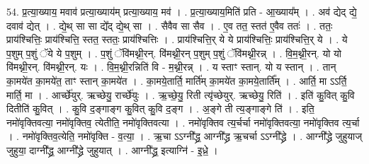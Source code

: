 \documentclass[17pt]{extarticle}
\begin{document}
54. प्र॒त्या॒ख्याय॒ मवाव॑ प्रत्या॒ख्याय॑म् प्रत्या॒ख्याय॒ मव॑ । . प्र॒त्या॒ख्याय॒मिति॑ प्रति - आ॒ख्याय᳚म् । . अव॑ द्येद् द्ये॒ दवाव॑ द्येत् । . द्ये॒थ् सा सा द्ये᳚द् द्ये॒थ् सा । . सैवैव सा सैव । . ए॒व तत॒ स्तत॑ ए॒वैव ततः॑ । . ततः॒ प्राय॑श्चित्तिः॒ प्राय॑श्चित्ति॒ स्तत॒ स्ततः॒ प्राय॑श्चित्तिः । . प्राय॑श्चित्ति॒र् ये ये प्राय॑श्चित्तिः॒ प्राय॑श्चित्ति॒र् ये । . ये प॒शुम् प॒शुं ॅये ये प॒शुम् । . प॒शुं ॅवि॑मथ्नी॒रन्. वि॑मथ्नी॒रन् प॒शुम् प॒शुं ॅवि॑मथ्नी॒रन्न् । . वि॒म॒थ्नी॒रन्. यो यो वि॑मथ्नी॒रन्. वि॑मथ्नी॒रन्. यः । . वि॒म॒थ्नी॒रन्निति॑ वि - म॒थ्नी॒रन्न् । . य स्ताꣳ स्तान्. यो य स्तान् । . तान् का॒मये॑त का॒मये॑त॒ ताꣳ स्तान् का॒मये॑त । . का॒मये॒तार्ति॒ मार्ति॑म् का॒मये॑त का॒मये॒तार्ति᳚म् । . आर्ति॒ मा ऽऽर्ति॒ मार्ति॒ मा । . आर्च्छे॑युर्. ऋच्छेयु॒ रार्च्छे॑युः । . ऋ॒च्छे॒यु॒ रिती त्यृ॑च्छेयुर्. ऋच्छेयु॒ रिति॑ । . इति॑ कु॒वित् कु॒वि दितीति॑ कु॒वित् । . कु॒वि द॒ङ्गाङ्ग कु॒वित् कु॒वि द॒ङ्ग । . अ॒ङ्गे ती त्य॒ङ्गाङ्गे ति॑ । . इति॒ नमो॑वृक्तिवत्या॒ नमो॑वृक्तिव॒ त्येतीति॒ नमो॑वृक्तिवत्या । . नमो॑वृक्तिव त्य॒र्चर्चा नमो॑वृक्तिवत्या॒ नमो॑वृक्तिव त्य॒र्चा । . नमो॑वृक्तिव॒त्येति॒ नमो॑वृक्ति - व॒त्या॒ । . ऋ॒चा ऽऽग्नी᳚द्ध्र॒ आग्नी᳚द्ध्र ऋ॒चर्चा ऽऽग्नी᳚द्ध्रे । . आग्नी᳚द्ध्रे जुहुयाज् जुहुया॒ दाग्नी᳚द्ध्र॒ आग्नी᳚द्ध्रे जुहुयात् । . आग्नी᳚द्ध्र॒ इत्याग्नि॑ - इ॒ध्रे॒ । \newline
\end{document}
